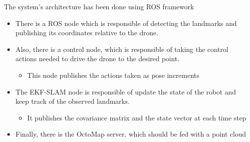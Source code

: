 \documentclass{beamer}
\begin{document}
    \begin{frame}
        The system's architecture has been done using ROS framework
        \begin{itemize}
            \item There is a ROS node which is responsible of detecting the landmarks and publishing its coordinates relative to the drone.
            \item Also, there is a control node, which is responsible of taking the control actions needed to drive the drone to the desired point.
            \begin{itemize}
                \item This node publishes the actions taken as pose increments
            \end{itemize}
            \item The EKF-SLAM node is responsible of update the state of the robot and keep track of the observed landmarks.
            \begin{itemize}
                \item It publishes the covariance matrix and the state vector at each time step
            \end{itemize}
            \item Finally, there is the OctoMap server, which should be fed with a point cloud
        \end{itemize}
    \end{frame}
\end{document}
